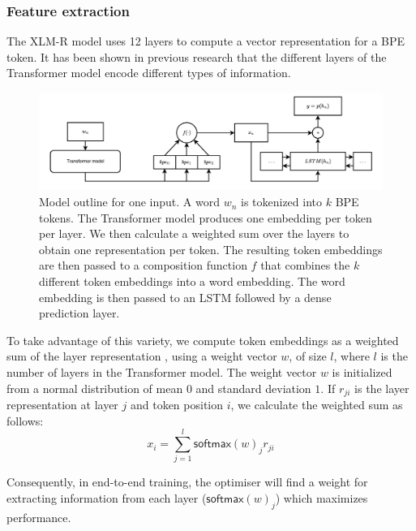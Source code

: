\documentclass[11pt]{article}
\newcommand\citep{\cite}
\newcommand\softmax{\mathsf{softmax}}
\begin{document}
	\subsubsection{Feature extraction}
        \label{sec:bpe-features}

    The XLM-R model uses 12 layers to compute a vector representation
     for a BPE token. It has been shown in previous research
     \citep{kondratyukstraka,raganato2018analysis,liu2019linguistic}
     that the different layers of the Transformer model encode
     different types of information.

    \begin{figure}%
    \centering
	\includegraphics[scale=0.5]{single-step-final.pdf}
            \caption{\label{fig:model} Model outline for one input. A
     word $w_n$ is tokenized into $k$ BPE tokens. The Transformer
     model produces one embedding per token per layer.  We then calculate
     a weighted sum over the layers to obtain one representation
     per token.  The resulting token embeddings are then passed to
     a composition function $f$ that combines the $k$ different token
     embeddings into a word embedding. The word embedding is then passed
     to an LSTM followed by a dense prediction layer. }
	\end{figure}

                        To take advantage of this variety, we compute
     token embeddings as a weighted sum of the layer representation
     \citep{kondratyukstraka}, using a weight vector $w$, of size $l$,
     where $l$ is the number of layers in the Transformer model.  The
     weight vector $w$ is initialized from a normal distribution of
     mean $0$ and standard deviation $1$. If $r_{ji}$ is the layer
     representation at layer $j$ and token position $i$, we calculate
     the weighted sum as follows:
    \begin{equation}
		x_i = \sum_{j=1}^{l} \softmax(w)_j r_{ji}
	\end{equation}

     Consequently, in end-to-end training, the optimiser will find a
     weight for extracting information from each layer
     ($\softmax(w)_j$) which maximizes performance.
\end{document}
